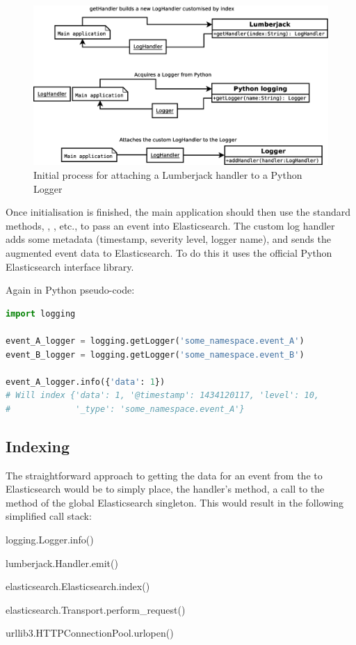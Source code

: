 \documentclass[a4paper,11pt]{article} %
\begin{document}
\begin{figure}[h]
  \centering
  \includegraphics[width=\textwidth]{initialisation_step}
  \caption{Initial process for attaching a Lumberjack handler to a Python Logger}
  \label{fig:implementation.initialisation_step}
\end{figure}

Once initialisation is finished, the main application should then use the
standard  methods, , , etc., to
pass an event into Elasticsearch.  The custom log handler adds some metadata
(timestamp, severity level, logger name), and sends the augmented event data to
Elasticsearch.  To do this it uses the official Python Elasticsearch interface
library.

Again in Python pseudo-code:

\begin{lstlisting}[language=Python,basicstyle=\ttfamily]
import logging

event_A_logger = logging.getLogger('some_namespace.event_A')
event_B_logger = logging.getLogger('some_namespace.event_B')

event_A_logger.info({'data': 1})
# Will index {'data': 1, '@timestamp': 1434120117, 'level': 10,
#             '_type': 'some_namespace.event_A'}
\end{lstlisting}

\subsection{Indexing}
\label{sec:implementation.indexing}
The straightforward approach to getting the data for an event from the
 to Elasticsearch would be to simply place, the handler's
 method, a call to the  method of the global
Elasticsearch singleton.  This would result in the following simplified call
stack:
\begin{enumerate*}
  \item logging.Logger.info()
  \item lumberjack.Handler.emit()
  \item elasticsearch.Elasticsearch.index()
  \item elasticsearch.Transport.perform\_request()
  \item urllib3.HTTPConnectionPool.urlopen()
\end{enumerate*}
\end{document}

